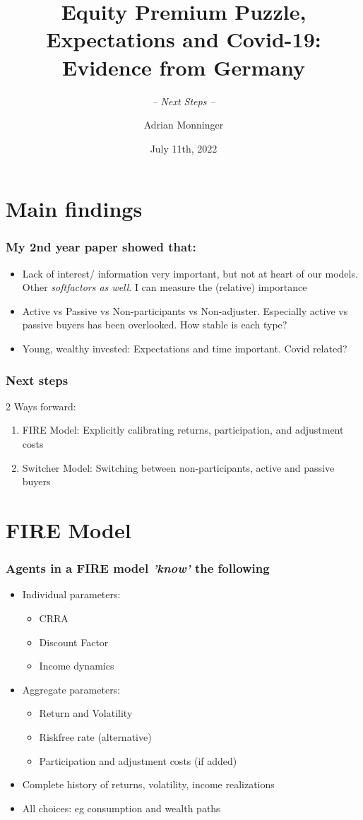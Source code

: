 \documentclass[pdflatex]{beamer}
\title[EPP, Expectations and Covid-19] {Equity Premium Puzzle, Expectations and Covid-19:\\ Evidence from Germany}
\subtitle{ \vspace{0.25em} \textit{-- Next Steps --} }
\author[A. Monninger]{Adrian Monninger\inst{1}}
\institute[]{\inst{1} Johns Hopkins University}
\date{July 11th, 2022}
\begin{document}
	
	\begin{frame}
		\titlepage
	\end{frame}

\section{Main findings}
\begin{frame}
	\frametitle{My 2nd year paper showed that:}
	\begin{itemize}
		\item Lack of interest/ information very important, but not at heart of our models. Other \textit{softfactors as well}. I can measure the (relative) importance
		\item Active vs Passive vs Non-participants vs Non-adjuster. Especially active vs passive buyers has been overlooked. How stable is each type?
		\item Young, wealthy invested: Expectations and time important. Covid related?
	\end{itemize}
\end{frame}

\begin{frame}
	\frametitle{Next steps}
	2 Ways forward:
	\begin{enumerate}
		\item FIRE Model: Explicitly calibrating returns, participation, and adjustment costs
		\item Switcher Model: Switching between non-participants, active and passive buyers
	\end{enumerate}
\end{frame}

\section{FIRE Model}
\begin{frame}
	\frametitle{Agents in a FIRE model \textit{'know'} the following}
	\begin{itemize}
		\item Individual parameters:
		\begin{itemize}
			\item CRRA
			\item Discount Factor
			\item Income dynamics
		\end{itemize}
		\item Aggregate parameters:
		\begin{itemize}
			\item Return and Volatility
			\item Riskfree rate (alternative)
			\item Participation and adjustment costs (if added)
		\end{itemize}
		\item Complete history of returns, volatility, income realizations
		\item All choices: eg consumption and wealth paths	
		\end{itemize}
\end{frame}
\end{document}
